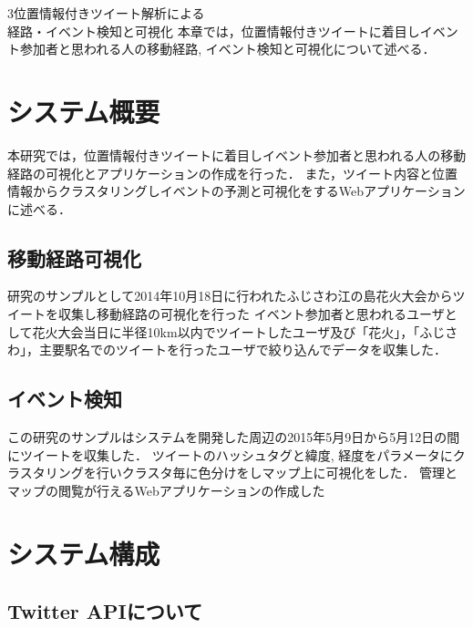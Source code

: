 \chapterhead
{3}{位置情報付きツイート解析による\\
経路・イベント検知と可視化}
{本章では，位置情報付きツイートに着目しイベント参加者と思われる人の移動経路, イベント検知と可視化について述べる．}


\section{システム概要}
本研究では，位置情報付きツイートに着目しイベント参加者と思われる人の移動経路の可視化とアプリケーションの作成を行った．
また，ツイート内容と位置情報からクラスタリングしイベントの予測と可視化をするWebアプリケーションに述べる．

\subsection{移動経路可視化}
研究のサンプルとして2014年10月18日に行われたふじさわ江の島花火大会\cite{webpagefujisawa}からツイートを収集し移動経路の可視化を行った
イベント参加者と思われるユーザとして花火大会当日に半径10km以内でツイートしたユーザ及び「花火」，「ふじさわ」，主要駅名でのツイートを行ったユーザで絞り込んでデータを収集した．


\subsection{イベント検知}
この研究のサンプルはシステムを開発した周辺の2015年5月9日から5月12日の間にツイートを収集した．
ツイートのハッシュタグと緯度, 経度をパラメータにクラスタリングを行いクラスタ毎に色分けをしマップ上に可視化をした．
管理とマップの閲覧が行えるWebアプリケーションの作成した



\newpage

\section{システム構成}
\subsection{Twitter APIについて}
